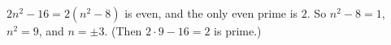 $2n^2-16=2(n^2-8)$ is even, and the only even prime is $2$. So $n^2-8=1$, $n^2=9$, and $n=\boxed{\pm3}$. (Then $2\cdot9-16=2$ is prime.)
